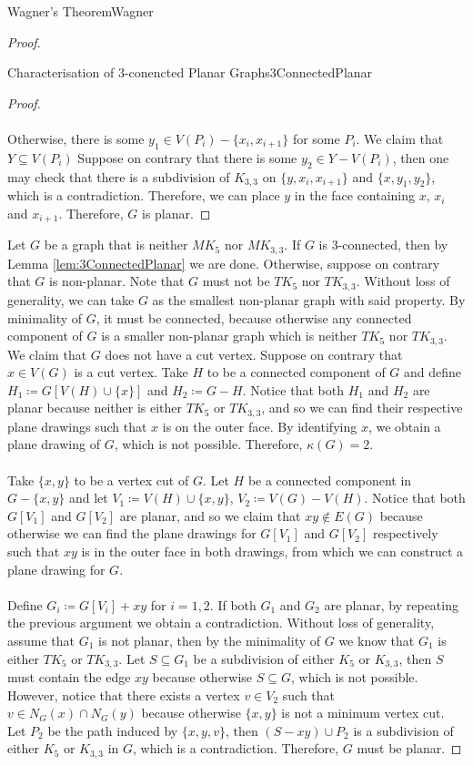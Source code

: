 \documentclass[math, code]{amznotes}
\theoremstyle{remark}
\begin{document}
\begin{thmbox}{Wagner's Theorem}{Wagner}
\begin{proof}
\begin{lembox}{Characterisation of $3$-conencted Planar Graphs}{3ConnectedPlanar}
\begin{proof}
                \\\\
                Otherwise, there is some $y_1 \in V(P_i) - \{x_i, x_{i + 1}\}$ for some $P_i$. We claim that $Y \subseteq V(P_i)$ Suppose on contrary that there is some $y_2 \in Y - V(P_i)$, then one may check that there is a subdivision of $K_{3, 3}$ on $\{y, x_i, x_{i + 1}\}$ and $\{x, y_1, y_2\}$, which is a contradiction. Therefore, we can place $y$ in the face containing $x$, $x_i$ and $x_{i + 1}$. Therefore, $G$ is planar.
            \end{proof}
        \end{lembox}
        Let $G$ be a graph that is neither $MK_5$ nor $MK_{3, 3}$. If $G$ is $3$-connected, then by Lemma \ref{lem:3ConnectedPlanar} we are done. Otherwise, suppose on contrary that $G$ is non-planar. Note that $G$ must not be $TK_5$ nor $TK_{3, 3}$. Without loss of generality, we can take $G$ as the smallest non-planar graph with said property. By minimality of $G$, it must be connected, because otherwise any connected component of $G$ is a smaller non-planar graph which is neither $TK_5$ nor $TK_{3, 3}$. We claim that $G$ does not have a cut vertex. Suppose on contrary that $x \in V(G)$ is a cut vertex. Take $H$ to be a connected component of $G$ and define $H_1 \coloneqq G[V(H) \cup \{x\}]$ and $H_2 \coloneqq G - H$. Notice that both $H_1$ and $H_2$ are planar because neither is either $TK_5$ or $TK_{3, 3}$, and so we can find their respective plane drawings such that $x$ is on the outer face. By identifying $x$, we obtain a plane drawing of $G$, which is not possible. Therefore, $\kappa(G) = 2$. 
        \\\\
        Take $\{x, y\}$ to be a vertex cut of $G$. Let $H$ be a connected component in $G - \{x, y\}$ and let $V_1 \coloneqq V(H) \cup \{x, y\}$, $V_2 \coloneqq V(G) - V(H)$. Notice that both $G[V_1]$ and $G[V_2]$ are planar, and so we claim that $xy \notin E(G)$ because otherwise we can find the plane drawings for $G[V_1]$ and $G[V_2]$ respectively such that $xy$ is in the outer face in both drawings, from which we can construct a plane drawing for $G$. 
        \\\\
        Define $G_i \coloneqq G[V_i] + xy$ for $i = 1, 2$. If both $G_1$ and $G_2$ are planar, by repeating the previous argument we obtain a contradiction. Without loss of generality, assume that $G_1$ is not planar, then by the minimality of $G$ we know that $G_1$ is either $TK_5$ or $TK_{3, 3}$. Let $S \subseteq G_1$ be a subdivision of either $K_5$ or $K_{3, 3}$, then $S$ must contain the edge $xy$ because otherwise $S \subseteq G$, which is not possible. However, notice that there exists a vertex $v \in V_2$ such that $v \in N_G(x) \cap N_G(y)$ because otherwise $\{x, y\}$ is not a minimum vertex cut. Let $P_2$ be the path induced by $\{x, y, v\}$, then $(S - xy) \cup P_2$ is a subdivision of either $K_5$ or $K_{3, 3}$ in $G$, which is a contradiction. Therefore, $G$ must be planar.
    \end{proof}
\end{thmbox}
\end{document}
